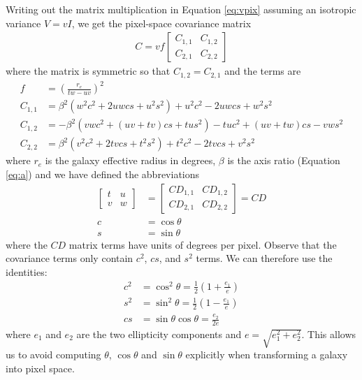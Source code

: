 \documentclass[11pt,preprint]{aastex}
\newcommand{\eqnref}[1]{Equation \ref{#1}}
\newcommand{\CD}{C\!D}
\begin{document}
Writing out the matrix multiplication in \eqnref{eq:vpix} assuming an
isotropic variance $V = v I$, we get the pixel-space covariance matrix
\begin{align}
C = v f \begin{bmatrix}
C_{1,1} & C_{1,2} \\
C_{2,1} & C_{2,2}
\end{bmatrix}
\end{align}
where the matrix is symmetric so that $C_{1,2} = C_{2,1}$ and the terms are
\begin{align}
f & = \left( \frac{r_e}{t w - u v} \right)^2
\\
C_{1,1} & =
%
\beta^2(w^2 c^2 + 2 u w c s + u^2 s^2) + u^2 c^2 - 2 u w c s + w^2 s^2
\\
C_{1,2} & =
%
-\beta^2 (v w c^2 + (u v + t v) c s + t u s^2) - t u c^2 + (u v + t w) c s - v w s^2
\\
C_{2,2} & =
%
\beta^2 (v^2 c^2 + 2 t v c s + t^2 s^2) + t^2 c^2 - 2 t v c s + v^2 s^2
\end{align}
where $r_e$ is the galaxy effective radius in degrees,
$\beta$ is the axis ratio (\eqnref{eq:a}) and
we have defined the abbreviations
\begin{align}
\begin{bmatrix}
t & u \\
v & w
\end{bmatrix}
& = 
\begin{bmatrix}
\CD_{1,1} & \CD_{1,2} \\
\CD_{2,1} & \CD_{2,2}
\end{bmatrix}
=
\CD
\\
c &= \cos \theta \\
s &= \sin \theta
\end{align}
where the $\CD$ matrix terms have units of degrees per pixel.
Observe that the covariance terms only contain $c^2$, $cs$, and $s^2$
terms.  We can therefore use the identities:
\begin{align}
c^2 & = \cos^2 \theta            =
\tfrac{1}{2} \left(1 + \frac{e_1}{e} \right) \\
s^2 & = \sin^2 \theta            =
\tfrac{1}{2} \left(1 - \frac{e_1}{e} \right) \\
cs  & = \sin \theta \cos \theta  = %
\frac{e_2}{2 e}
\end{align}
where $e_1$ and $e_2$ are the two ellipticity components and $e =
\sqrt{e_1^2 + e_2^2}$.  This allows us to avoid computing $\theta$,
$\cos \theta$ and $\sin \theta$ explicitly when transforming a galaxy
into pixel space.
\end{document}
